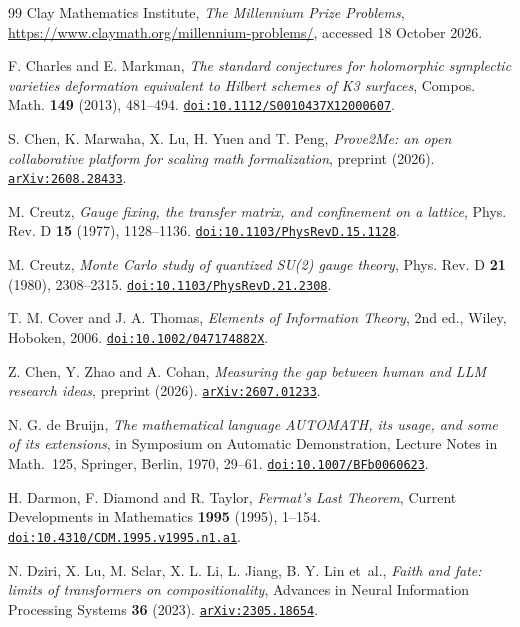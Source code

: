 \begin{thebibliography}{99}
Clay Mathematics Institute,
\emph{The Millennium Prize Problems},
\url{https://www.claymath.org/millennium-problems/}, accessed 18 October 2026.

F. Charles and E. Markman,
\emph{The standard conjectures for holomorphic symplectic varieties deformation equivalent to Hilbert schemes of K3 surfaces},
Compos. Math. \textbf{149} (2013), 481--494.
\href{https://doi.org/10.1112/S0010437X12000607}{\nolinkurl{doi:10.1112/S0010437X12000607}}.

S. Chen, K. Marwaha, X. Lu, H. Yuen and T. Peng,
\emph{Prove2Me: an open collaborative platform for scaling math formalization},
preprint (2026).
\href{https://arxiv.org/abs/2608.28433}{\nolinkurl{arXiv:2608.28433}}.

M. Creutz,
\emph{Gauge fixing, the transfer matrix, and confinement on a lattice},
Phys. Rev. D \textbf{15} (1977), 1128--1136.
\href{https://doi.org/10.1103/PhysRevD.15.1128}{\nolinkurl{doi:10.1103/PhysRevD.15.1128}}.

M. Creutz,
\emph{Monte Carlo study of quantized SU(2) gauge theory},
Phys. Rev. D \textbf{21} (1980), 2308--2315.
\href{https://doi.org/10.1103/PhysRevD.21.2308}{\nolinkurl{doi:10.1103/PhysRevD.21.2308}}.

T. M. Cover and J. A. Thomas,
\emph{Elements of Information Theory}, 2nd ed.,
Wiley, Hoboken, 2006.
\href{https://doi.org/10.1002/047174882X}{\nolinkurl{doi:10.1002/047174882X}}.

Z. Chen, Y. Zhao and A. Cohan,
\emph{Measuring the gap between human and LLM research ideas},
preprint (2026).
\href{https://arxiv.org/abs/2607.01233}{\nolinkurl{arXiv:2607.01233}}.

N. G. de Bruijn,
\emph{The mathematical language AUTOMATH, its usage, and some of its extensions},
in Symposium on Automatic Demonstration, Lecture Notes in Math.~125, Springer, Berlin, 1970, 29--61.
\href{https://doi.org/10.1007/BFb0060623}{\nolinkurl{doi:10.1007/BFb0060623}}.

H. Darmon, F. Diamond and R. Taylor,
\emph{Fermat's Last Theorem},
Current Developments in Mathematics \textbf{1995} (1995), 1--154.
\href{https://doi.org/10.4310/CDM.1995.v1995.n1.a1}{\nolinkurl{doi:10.4310/CDM.1995.v1995.n1.a1}}.

N. Dziri, X. Lu, M. Sclar, X. L. Li, L. Jiang, B. Y. Lin et~al.,
\emph{Faith and fate: limits of transformers on compositionality},
Advances in Neural Information Processing Systems \textbf{36} (2023).
\href{https://arxiv.org/abs/2305.18654}{\nolinkurl{arXiv:2305.18654}}.


\end{thebibliography}
